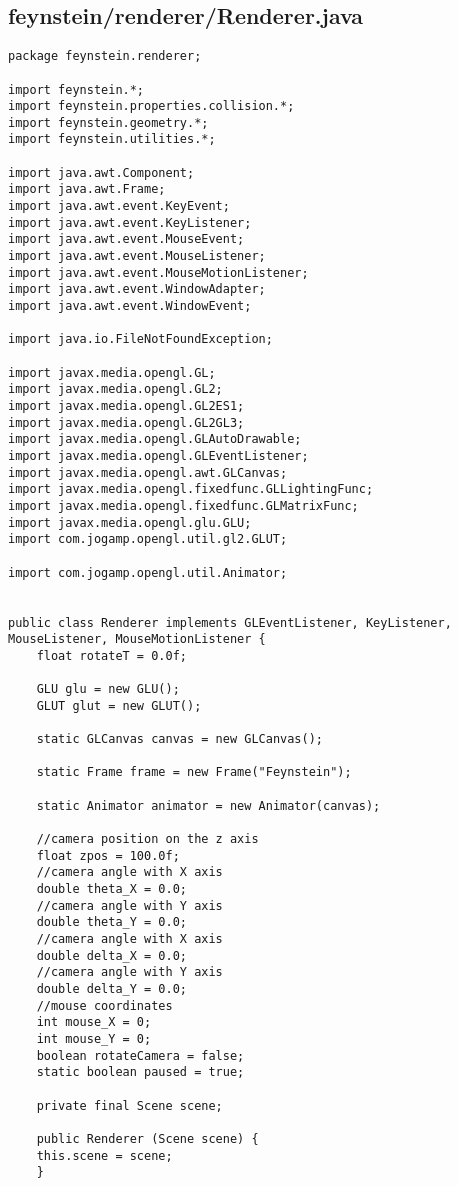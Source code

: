 \subsection*{feynstein/renderer/Renderer.java}
\begin{lstlisting}
package feynstein.renderer;

import feynstein.*;
import feynstein.properties.collision.*;
import feynstein.geometry.*;
import feynstein.utilities.*;

import java.awt.Component;
import java.awt.Frame;
import java.awt.event.KeyEvent;
import java.awt.event.KeyListener;
import java.awt.event.MouseEvent;
import java.awt.event.MouseListener;
import java.awt.event.MouseMotionListener;
import java.awt.event.WindowAdapter;
import java.awt.event.WindowEvent;
 
import java.io.FileNotFoundException;

import javax.media.opengl.GL;
import javax.media.opengl.GL2;
import javax.media.opengl.GL2ES1;
import javax.media.opengl.GL2GL3;
import javax.media.opengl.GLAutoDrawable;
import javax.media.opengl.GLEventListener;
import javax.media.opengl.awt.GLCanvas;
import javax.media.opengl.fixedfunc.GLLightingFunc;
import javax.media.opengl.fixedfunc.GLMatrixFunc;
import javax.media.opengl.glu.GLU;
import com.jogamp.opengl.util.gl2.GLUT; 
 
import com.jogamp.opengl.util.Animator;


public class Renderer implements GLEventListener, KeyListener, MouseListener, MouseMotionListener {
    float rotateT = 0.0f;
	
    GLU glu = new GLU();
    GLUT glut = new GLUT();

    static GLCanvas canvas = new GLCanvas();
 
    static Frame frame = new Frame("Feynstein");
 
    static Animator animator = new Animator(canvas);
	
    //camera position on the z axis
    float zpos = 100.0f;
    //camera angle with X axis
    double theta_X = 0.0;
    //camera angle with Y axis
    double theta_Y = 0.0;
    //camera angle with X axis
    double delta_X = 0.0;
    //camera angle with Y axis
    double delta_Y = 0.0;
    //mouse coordinates
    int mouse_X = 0;
    int mouse_Y = 0;
    boolean rotateCamera = false;
    static boolean paused = true;
	
    private final Scene scene;
 
    public Renderer (Scene scene) {
	this.scene = scene;
    }


\end{lstlisting}
